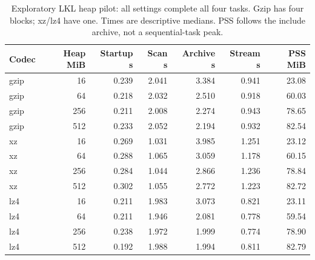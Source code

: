 \begin{table}[h]\centering\small
\caption{Exploratory LKL heap pilot: all settings complete all four tasks. Gzip has four blocks; xz/lz4 have one. Times are descriptive medians. PSS follows the include archive, not a sequential-task peak.}
\begin{tabular}{lrrrrrr}\toprule Codec & Heap MiB & Startup s & Scan s & Archive s & Stream s & PSS MiB \\ \midrule
gzip & 16 & 0.239 & 2.041 & 3.384 & 0.941 & 23.08 \\
gzip & 64 & 0.218 & 2.032 & 2.510 & 0.918 & 60.03 \\
gzip & 256 & 0.211 & 2.008 & 2.274 & 0.943 & 78.65 \\
gzip & 512 & 0.233 & 2.052 & 2.194 & 0.932 & 82.54 \\
xz & 16 & 0.269 & 1.031 & 3.985 & 1.251 & 23.12 \\
xz & 64 & 0.288 & 1.065 & 3.059 & 1.178 & 60.15 \\
xz & 256 & 0.284 & 1.044 & 2.866 & 1.236 & 78.84 \\
xz & 512 & 0.302 & 1.055 & 2.772 & 1.223 & 82.72 \\
lz4 & 16 & 0.211 & 1.983 & 3.073 & 0.821 & 23.11 \\
lz4 & 64 & 0.211 & 1.946 & 2.081 & 0.778 & 59.54 \\
lz4 & 256 & 0.238 & 1.972 & 1.999 & 0.774 & 78.90 \\
lz4 & 512 & 0.192 & 1.988 & 1.994 & 0.811 & 82.79 \\
\bottomrule\end{tabular}\end{table}
